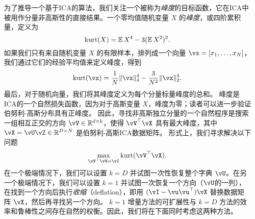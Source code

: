 \documentclass[../../book-main_zh.tex]{subfiles}
\begin{document}
为了推导一个基于ICA的算法，我们关注一个被称为\textit{峰度}的目标函数，它在ICA中被用作分量非高斯性的直接结果。一个零均值随机变量 $X$ 的\textit{峰度}，或四阶累积量，定义为
\begin{equation}\label{eq:kurtosis}
\mathop{\mathrm{kurt}}(X) = \operatorname{\mathbb{E}}{X^4} - 3 (\operatorname{\mathbb{E}}{X^2})^2.
\end{equation}
如果我们只有来自随机变量 $X$ 的有限样本，排列成一个向量 $\vx = [x_1, \dots, x_N]$，我们通过它们的经验平均值来定义峰度，得到
\begin{equation}\label{eq:kurtosis-vector}
\kurt(\vx) = \frac{1}{N} \norm{\vx}_4^4 - \frac{3}{N^2} \norm{\vx}_2^4.
\end{equation}
最后，对于随机向量，我们将其峰度定义为每个分量标量峰度的总和。
峰度是ICA的一个自然损失函数，因为对于高斯变量 $X$，峰度为零；读者可以进一步验证伯努利-高斯分布具有正峰度。
因此，寻找非高斯独立分量的一个自然程序是搜索一组相互正交的方向 $\vV \in \R^{d \times k}$，使得 $\vV^\top \vX$ 具有最大峰度，其中 $\vX = \vU \vZ \in \R^{D \times N}$ 是伯努利-高斯ICA数据矩阵。
形式上，我们寻求解决以下问题
\begin{equation}
    \max_{\vV^\top \vV = \vI} \kurt(\vV^\top \vX).
\end{equation}
在一个极端情况下，我们可以设置 $k = D$ 并试图一次性恢复整个字典 $\vU$。在另一个极端情况下，我们可以设置 $k=1$ 并试图一次恢复一个方向（$\vU$的一列），在找到一个方向后执行\textit{收缩}（deflation），即用 $(\vI - \vu\vu^\top) \vX$ 替换数据矩阵 $\vX$，然后再寻找另一个方向。
$k=1$ 增量方法的可扩展性与 $k=D$ 方法的效率和鲁棒性之间存在自然的权衡。因此，我们将在下面同时考虑这两种方法。
\end{document}
